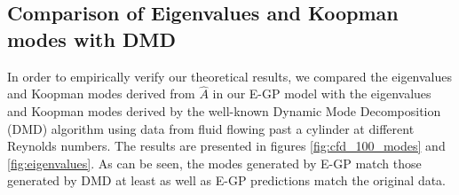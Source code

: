 \documentclass[letterpaper,12pt,peerreviewca,draftcls]{IEEEtran}
\newcommand{\dualop}{A}
\newcommand{\dualopApprox}{\widehat{\dualop}}
\begin{document}
\subsection{Comparison of Eigenvalues and Koopman modes with DMD}

In order to empirically verify our theoretical results, we compared the eigenvalues and Koopman modes derived from $\dualopApprox$ in our E-GP model with the eigenvalues and Koopman modes derived by the well-known Dynamic Mode Decomposition (DMD) algorithm using data from fluid flowing past a cylinder at different Reynolds numbers. The results are presented in figures \ref{fig:cfd_100_modes} and \ref{fig:eigenvalues}. As can be seen, the modes generated by E-GP match those generated by DMD at least as well as E-GP predictions match the original data.
\end{document}

